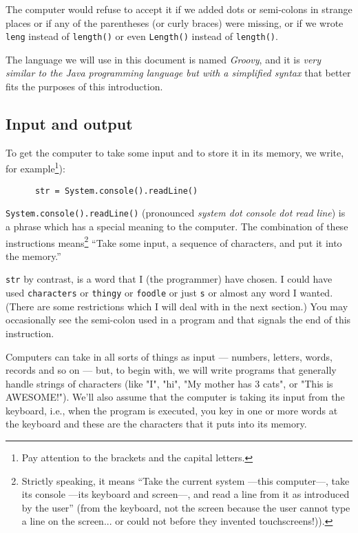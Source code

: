 The computer would refuse to accept it if we added dots or semi-colons in strange places
or if any of the parentheses (or curly braces) were missing, or if we wrote
\verb!leng! instead of \verb!length()! or even \verb!Length()! instead of \verb!length()!.

The language we will use in this document is named \emph{Groovy}, and
it is \emph{very similar to the Java programming language but with a
simplified syntax} that better fits the purposes of this introduction. 

\subsection{Input and output}

To get the computer to take some input and to store it
in its memory, we write, for example\footnote{Pay attention to the brackets
and the capital letters.}):

\begin{Verbatim}
      str = System.console().readLine()
\end{Verbatim}

\verb!System.console().readLine()! (pronounced \emph{system dot
  console dot read line}) is a phrase which has a special meaning to
the computer. The combination of these instructions
means\footnote{Strictly speaking, it means ``Take the current system
  ---this computer---, take its console ---its keyboard and screen---,
and read a line from it as introduced by the user'' (from the keyboard,
not the screen because the user cannot type a line on the screen... or
could not before they invented touchscreens!)).} ``Take
some input, a sequence of characters, and put it into the memory.''

\verb!str! by contrast, is a word that I (the programmer) have chosen.
I could have used \verb!characters! or \verb!thingy! or \verb!foodle!
or just \verb!s! or almost any word I wanted. (There are some
restrictions which I will deal with in the next section.)  You may
occasionally see the semi-colon used in a program and that signals the
end of this instruction.

Computers can take in all sorts of things as input --- numbers,
letters, words, records and so on --- but, to begin with, we will
write programs that generally handle strings of characters (like
"I", "hi", "My mother has 3 cats", or "This is AWESOME!").
We'll also assume that the computer is taking its input from the
keyboard, i.e., when the program is executed, you key in one or more
words at the keyboard and these are the characters that it puts into
its memory.

